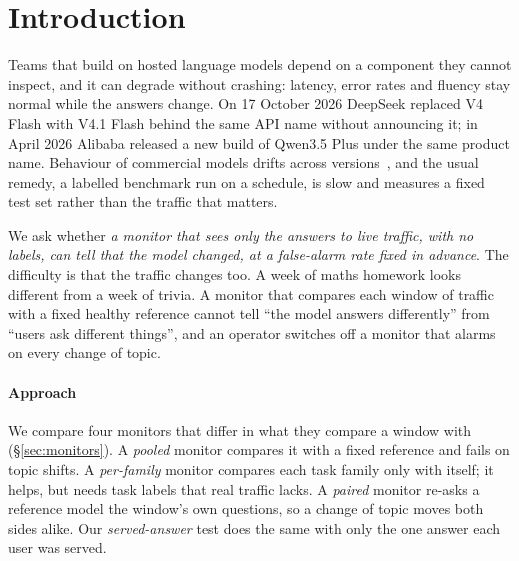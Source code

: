 \documentclass{article}
\begin{document}
\section{Introduction}

Teams that build on hosted language models depend on a component they cannot
inspect, and it can degrade without crashing: latency, error rates and fluency stay
normal while the answers change. On 17 October 2026 DeepSeek replaced V4 Flash with V4.1 Flash behind the
same API name without announcing it; in April 2026 Alibaba released a new build
of Qwen3.5 Plus under the same product name. Behaviour of
commercial models drifts across versions~\citep{chen2023chatgpt}, and the usual
remedy, a labelled benchmark run on a schedule, is slow and measures a fixed test
set rather than the traffic that matters.

We ask whether \emph{a monitor that sees only the answers to live traffic, with no
labels, can tell that the model changed, at a false-alarm rate fixed in advance}.
The difficulty is that the traffic changes too. A week of maths homework looks
different from a week of trivia. A monitor that compares each window of traffic
with a fixed healthy reference cannot tell ``the model answers differently'' from
``users ask different things'', and an operator switches off a monitor that alarms
on every change of topic.

\paragraph{Approach} We compare four monitors that differ in what they compare a
window with (\S\ref{sec:monitors}). A \emph{pooled} monitor compares it with a
fixed reference and fails on topic shifts. A \emph{per-family} monitor compares
each task family only with itself; it helps, but needs task labels that real
traffic lacks. A \emph{paired} monitor re-asks a reference model the window's own
questions, so a change of topic moves both sides alike. Our \emph{served-answer}
test does the same with only the one answer each user was served.
\end{document}
